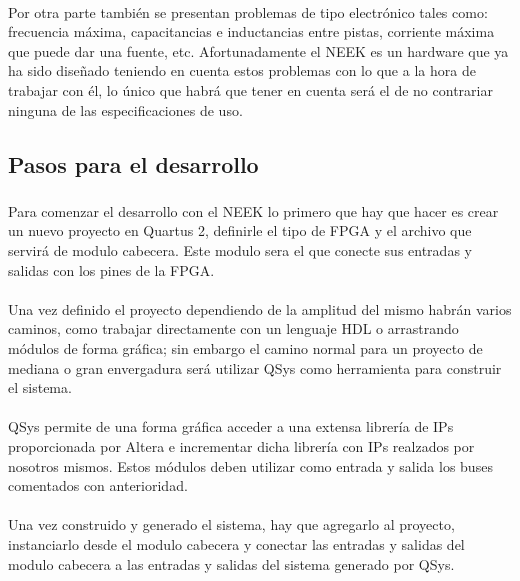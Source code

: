 \documentclass[a4paper,12pt,titlepage,final]{book}
\begin{document}
\paragraph{}
Por otra parte también se presentan problemas de tipo electrónico tales como: frecuencia máxima, capacitancias e inductancias entre pistas, corriente máxima que puede dar una fuente, etc. Afortunadamente el NEEK es un hardware que ya ha sido diseñado teniendo en cuenta estos problemas con lo que a la hora de trabajar con él, lo único que habrá que tener en cuenta será el de no contrariar ninguna de las especificaciones de uso.

\subsection{Pasos para el desarrollo}
\subsubsection*{}
\paragraph{}
Para comenzar el desarrollo con el NEEK lo primero que hay que hacer es crear un nuevo proyecto en Quartus 2, definirle el tipo de FPGA y el archivo que servirá de modulo cabecera. Este modulo sera el que conecte sus entradas y salidas con los pines de la FPGA.

\paragraph{}
Una vez definido el proyecto dependiendo de la amplitud del mismo habrán varios caminos, como trabajar directamente con un lenguaje HDL o arrastrando módulos de forma gráfica; sin embargo el camino normal para un proyecto de mediana o gran envergadura será utilizar QSys como herramienta para construir el sistema.

\paragraph{}
QSys permite de una forma gráfica acceder a una extensa librería de IPs proporcionada por Altera e incrementar dicha librería con IPs realzados por nosotros mismos. Estos módulos deben utilizar como entrada y salida los buses comentados con anterioridad.

\paragraph{}
Una vez construido y generado el sistema, hay que agregarlo al proyecto, instanciarlo desde el modulo cabecera y conectar las entradas y salidas del modulo cabecera a las entradas y salidas del sistema generado por QSys.
\end{document}
